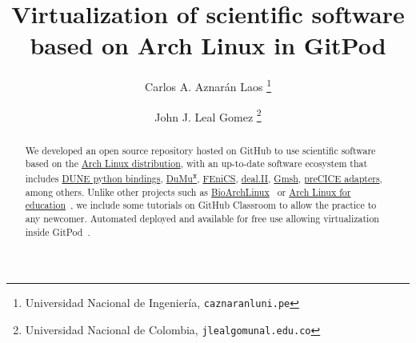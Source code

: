 \documentclass[a4paper,abstract=true]{scrartcl}
\date{}
\title{Virtualization of scientific software based on Arch Linux in GitPod}
\author{Carlos A. Aznarán Laos
\thanks{
  Universidad Nacional de Ingeniería,
\texttt{caznaranl\MVAt uni.pe}}
    \and John J. Leal Gomez
    \thanks{
    Universidad Nacional de Colombia,
		\texttt{jlealgom\MVAt unal.edu.co}}
}
\begin{document}
\maketitle

\begin{abstract}
	We developed an open source repository hosted on GitHub to use
	scientific software based on the \href{https://archlinux.org}{Arch Linux distribution},
	with an up-to-date software ecosystem that includes
	\href{https://dune-project.org/doc/gettingstarted}{DUNE python bindings},
	\href{https://dumux.org}{DuMu\textsuperscript{x}},
	\href{https://fenicsproject.org}{FEniCS},
	\href{https://www.dealii.org}{deal.II},
	\href{https://gmsh.info}{Gmsh},
	\href{https://precice.org/adapters-overview.html}{preCICE adapters},
	among others.
	Unlike other projects such as
	\href{https://github.com/BioArchLinux}{BioArchLinux}~\cite{bioarchlinux_2022}
	or \href{https://github.com/arch4edu}{Arch Linux for education}~\cite{arch4edu2019},
	we include some tutorials on GitHub Classroom to allow the practice
	to any newcomer.
	Automated deployed and available for free use allowing virtualization inside
	GitPod~\cite{gitpod_2022}.
\end{abstract}


\end{document}
